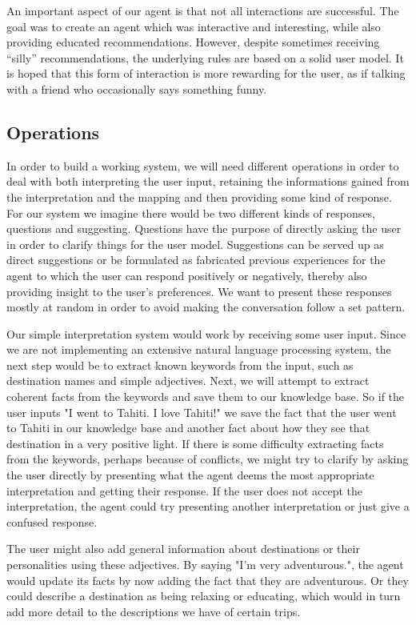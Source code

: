 \documentclass[11pt]{article} %
\begin{document}
An important aspect of our agent is that not all interactions are successful. The goal was to create an agent which was interactive and interesting, while also providing educated recommendations. However, despite sometimes receiving ``silly'' recommendations, the underlying rules are based on a solid user model. It is hoped that this form of interaction is more rewarding for the user, as if talking with a friend who occasionally says something funny.


\subsection{Operations}

In order to build a working system, we will need different operations in order to deal with both interpreting the user input, retaining the informations gained from the interpretation and the mapping and then providing some kind of response. For our system we imagine there would be two different kinds of responses, questions and suggesting. Questions have the purpose of directly asking the user in order to clarify things for the user model. Suggestions can be served up as direct suggestions or be formulated as fabricated previous experiences for the agent to which the user can respond positively or negatively, thereby also providing insight to the user's preferences.
We want to present these responses mostly at random in order to avoid making the conversation follow a set pattern.


Our simple interpretation system would work by receiving some user input. Since we are not implementing an extensive natural language processing system, the next step would be to extract known keywords from the input, such as destination names and simple adjectives. Next, we will attempt to extract coherent facts from the keywords and save them to our knowledge base. So if the user inputs "I went to Tahiti. I love Tahiti!"  we save the fact that the user went to Tahiti in our knowledge base and another fact about how they see that destination in a very positive light. If there is some difficulty extracting facts from the keywords, perhaps because of conflicts, we might try to clarify by asking the user directly by presenting what the agent deems the most appropriate interpretation and getting their response. If the user does not accept the interpretation, the agent could try presenting another interpretation or just give a confused response.

The user might also add general information about destinations or their personalities using these adjectives. By saying "I'm very adventurous.", the agent would update its facts by now adding the fact that they are adventurous. Or they could describe a destination as being relaxing or educating, which would in turn add more detail to the descriptions we have of certain trips.
\end{document}
